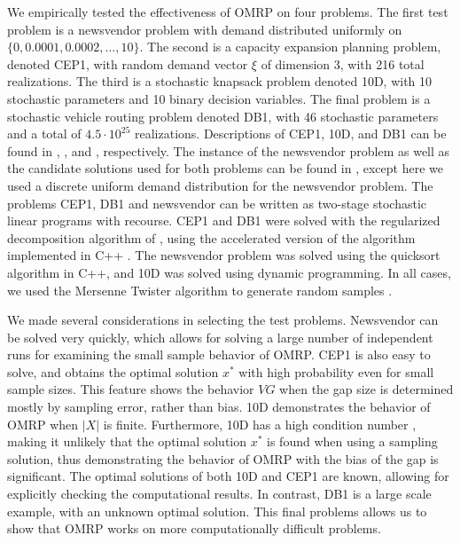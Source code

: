 \documentclass[12pt]{article}
\newcommand{\x}{x}
\newcommand{\xs}{\x^*}
\newcommand{\xit}{\xi}
\begin{document}
We empirically tested the effectiveness of OMRP on four problems.
The first test problem is a newsvendor problem with demand distributed uniformly on $\{0, 0.0001, 0.0002, \dots, 10\}$.
The second is a capacity expansion planning problem, denoted CEP1, with random demand vector $\xit$ of dimension 3, with 216 total realizations.
The third is a stochastic knapsack problem denoted 10D, with 10 stochastic parameters and 10 binary decision variables.
The final problem is a stochastic vehicle routing problem denoted DB1, with 46 stochastic parameters and a total of $4.5 \cdot 10^{25}$ realizations.
Descriptions of CEP1, 10D, and DB1 can be found in \citep{higle1996}, \citep{kleywegt2002sample}, and \citep{donohue1995upper}, respectively.
The instance of the newsvendor problem as well as the candidate solutions used for both problems can be found in \citep{Bayraksan2006}, except here we used a discrete uniform demand distribution for the newsvendor problem.  
The problems CEP1, DB1 and newsvendor can be written as two-stage stochastic linear programs with recourse.
CEP1 and DB1 were solved with the regularized decomposition algorithm of \citep{ruszczynski1986regularized}, using the accelerated version of the algorithm implemented in C++ \citep{ruszczynski1997accelerating}. 
The newsvendor problem was solved using the quicksort algorithm in C++, and 10D was solved using dynamic programming.  
In all cases, we used the Mersenne Twister algorithm to generate random samples \citep{wagner_twister_09}.

We made several considerations in selecting the test problems.
Newsvendor can be solved very quickly, which allows for solving a large number of independent runs for examining the small sample behavior of OMRP.
CEP1 is also easy to solve, and obtains the optimal solution $\xs$ with high probability even for small sample sizes.
This feature shows the behavior $VG$ when the gap size is determined mostly by sampling error, rather than bias.
10D demonstrates the behavior of OMRP when $|X|$ is finite.
Furthermore, 10D has a high condition number \citep{kleywegt2002sample}, making it unlikely that the optimal solution $\xs$ is found when using a sampling solution, thus demonstrating the behavior of OMRP with the bias of the gap is significant.
The optimal solutions of both 10D and CEP1 are known, allowing for explicitly checking the computational results.
In contrast, DB1 is a large scale example, with an unknown optimal solution.
This final problems allows us to show that OMRP works on more computationally difficult problems.
\end{document}
